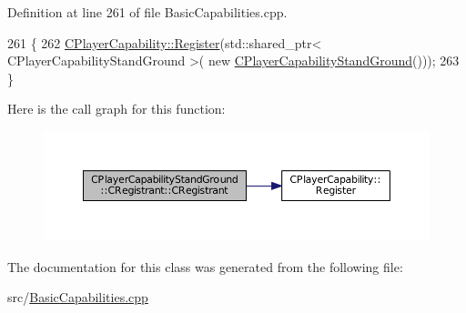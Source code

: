 Definition at line 261 of file Basic\+Capabilities.\+cpp.


\begin{DoxyCode}
261                                                     \{
262     \hyperlink{classCPlayerCapability_a7e298018dcde2684451add3cfff065f7}{CPlayerCapability::Register}(std::shared\_ptr< CPlayerCapabilityStandGround >(\textcolor{keyword}{
      new} \hyperlink{classCPlayerCapabilityStandGround_a58f0601edbe114a45ff27b84027afd09}{CPlayerCapabilityStandGround}()));   
263 \}
\end{DoxyCode}
Here is the call graph for this function\+:
\nopagebreak
\begin{figure}[H]
\begin{center}
\leavevmode
\includegraphics[width=350pt]{classCPlayerCapabilityStandGround_1_1CRegistrant_ad7c015829711721bab4ce08ef385e8ea_cgraph}
\end{center}
\end{figure}


The documentation for this class was generated from the following file\+:\begin{DoxyCompactItemize}
\item 
src/\hyperlink{BasicCapabilities_8cpp}{Basic\+Capabilities.\+cpp}\end{DoxyCompactItemize}

